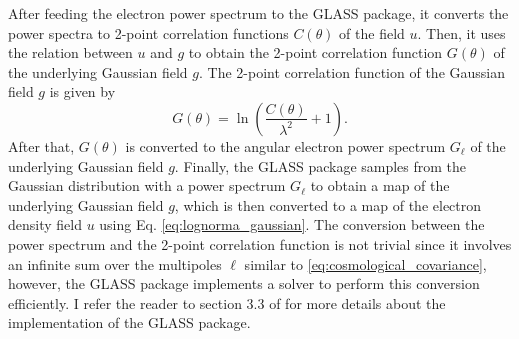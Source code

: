 After feeding the electron power spectrum to the GLASS package, it converts the power spectra to 2-point correlation functions $C(\theta)$ of the field $u$. Then, it uses the relation between $u$ and $g$ to obtain the 2-point correlation function $G(\theta)$ of the underlying Gaussian field $g$. The 2-point correlation function of the Gaussian field $g$ is given by
\begin{equation}
    G(\theta) = \ln\left( \frac{C(\theta)}{\lambda^2} + 1 \right).
\end{equation}
After that, $G(\theta)$ is converted to the angular electron power spectrum $G_\ell$ of the underlying Gaussian field $g$. Finally, the GLASS package samples from the Gaussian distribution with a power spectrum $G_\ell$ to obtain a map of the underlying Gaussian field $g$, which is then converted to a map of the electron density field $u$ using Eq. \ref{eq:lognorma_gaussian}. The conversion between the power spectrum and the 2-point correlation function is not trivial since it involves an infinite sum over the multipoles $\ell$ similar to \ref{eq:cosmological_covariance}, however, the GLASS package implements a solver to perform this conversion efficiently. I refer the reader to section 3.3 of \citet{tessore2023glass} for more details about the implementation of the GLASS package.

